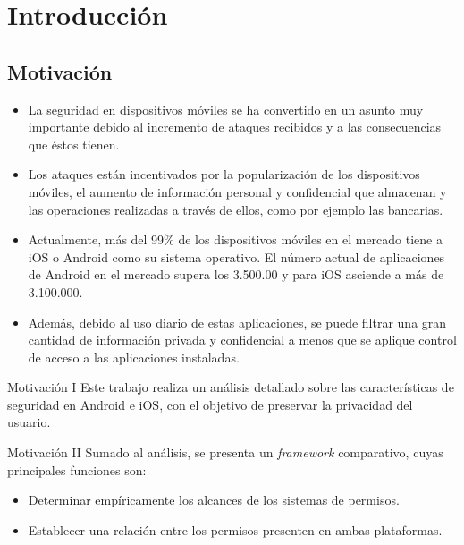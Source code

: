 \chapter{Introducción}
\section{Motivación}
 \begin{itemize}
  \item La seguridad en dispositivos móviles se ha convertido en un asunto muy importante debido al incremento de ataques recibidos y a las consecuencias que éstos tienen.
  \item Los ataques están incentivados por la popularización de los dispositivos móviles, el aumento de información personal y confidencial que almacenan y las operaciones realizadas a través de ellos, como por ejemplo las bancarias.
  \item Actualmente, más del 99\% de los dispositivos móviles en el mercado tiene a iOS o Android como su sistema operativo. El número actual de aplicaciones de Android en el mercado supera los 3.500.00 y para iOS asciende a más de 3.100.000.
  \item Además, debido al uso diario de estas aplicaciones, se puede filtrar una gran cantidad de información privada y confidencial a menos que se aplique control de acceso a las aplicaciones instaladas.
 \end{itemize}
 \begin{paragraph}{Motivación I}
Este trabajo realiza un análisis detallado sobre las características de seguridad en Android e iOS, con el objetivo de preservar la privacidad del usuario.
  \end{paragraph}
  \begin{paragraph}{Motivación II}
Sumado al análisis, se presenta un \emph{framework} comparativo, cuyas principales funciones son:
    \begin{itemize}
     \item Determinar empíricamente los alcances de los sistemas de permisos.
     \item Establecer una relación entre los permisos presenten en ambas plataformas.
    \end{itemize}
   \end{paragraph}
%

%